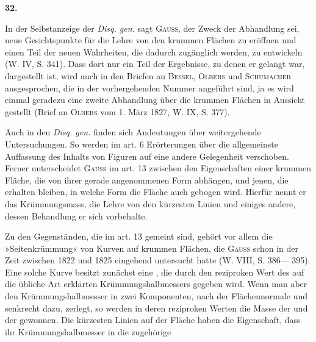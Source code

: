 \clearpage\begingroup{}
\renewcommand{\thefootnote}{\arabic{footnote})}\setcounter{footnote}{0}
\begin{center}
\textbf{32.}\par\smallskip
{}
\end{center}
\noindent\hspace*{\parindent}In der Selbstanzeige der \textit{Disq. gen.} sagt \textsc{Gauss}, der Zweck der Abhandlung
sei, neue Gesichtspunkte für die Lehre von den krummen Flächen zu
eröffnen und einen Teil der neuen Wahrheiten, die dadurch zugänglich werden,
\clearpage{}\setcounter{footnote}{0}
\noindent zu entwickeln (W. IV, S. 341). Dass dort nur ein Teil der Ergebnisse, zu
denen er gelangt war, dargestellt ist, wird auch in den Briefen an \textsc{Bessel}, \textsc{Olbers}
und \textsc{Schumacher} ausgesprochen, die in der vorhergehenden Nummer angeführt
sind, ja es wird einmal geradezu eine zweite Abhandlung über die krummen
Flächen in Aussicht gestellt (Brief an \textsc{Olbers} vom 1. März 1827, W. IX, S. 377).
\par
Auch in den \textit{Disq. gen.} finden sich Andeutungen über weitergehende
Untersuchungen. So werden im art. 6 Erörterungen über die allgemeinste
Auffassung des Inhalts von Figuren auf eine andere Gelegenheit verschoben.
Ferner unterscheidet \textsc{Gauss} im art. 13 zwischen den Eigenschaften einer
krummen Fläche, die von ihrer gerade angenommenen Form abhängen, und
jenen, die erhalten bleiben, in welche Form die Fläche auch gebogen wird.
Hierfür nennt er das Krümmungsmass, die Lehre von den kürzesten Linien
und einiges andere, dessen Behandlung er sich vorbehalte.
\par
Zu den Gegenständen, die im art. 13 gemeint sind, gehört vor allem die
»Seitenkrümmung« von Kurven auf krummen Flächen, die \textsc{Gauss} schon in der
Zeit zwischen 1822 und 1825 eingehend untersucht hatte (W. VIII, S. 386—
395). Eine solche Kurve besitzt zunächst eine , die
durch den reziproken Wert des auf die übliche Art erklärten Krümmungshalbmessers
gegeben wird. Wenn man aber den Krümmungshalbmesser in
zwei Komponenten, nach der Flächennormale und senkrecht dazu, zerlegt, so
werden in deren reziproken Werten die Masse der  und
der  gewonnen. Die kürzesten Linien auf der Fläche
haben die Eigenschaft, dass ihr Krümmungshalbmesser in die zugehörige
